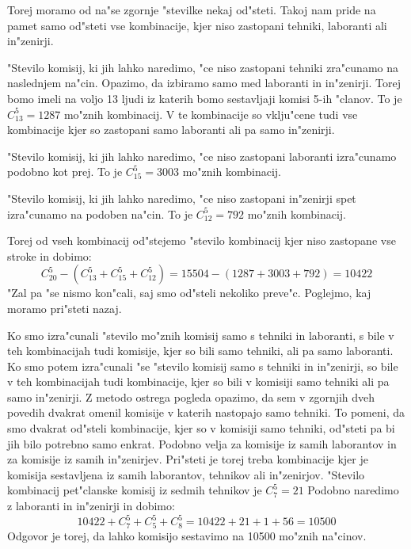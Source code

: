 \documentclass[a4paper, 12pt]{article}
\begin{document}
Torej moramo od na"se zgornje "stevilke nekaj od"steti. Takoj nam pride na pamet samo od"steti vse kombinacije, kjer niso zastopani tehniki, laboranti ali in"zenirji.

"Stevilo komisij, ki jih lahko naredimo, "ce niso zastopani tehniki zra"cunamo na naslednjem na"cin. Opazimo, da izbiramo samo med laboranti in in"zenirji. Torej bomo imeli na voljo 13 ljudi iz katerih bomo sestavljaji komisi 5-ih "clanov. To je $C_{13}^5 = 1287$ mo"znih kombinacij. V te kombinacije so vklju"cene tudi vse kombinacije kjer so zastopani samo laboranti ali pa samo in"zenirji.

"Stevilo komisij, ki jih lahko naredimo, "ce niso zastopani laboranti izra"cunamo podobno kot prej. To je $C_{15}^5 = 3003$ mo"znih kombinacij.

"Stevilo komisij, ki jih lahko naredimo, "ce niso zastopani in"zenirji spet izra"cunamo na podoben na"cin. To je $C_{12}^5 = 792$ mo"znih kombinacij.

Torej od vseh kombinacij od"stejemo "stevilo kombinacij kjer niso zastopane vse stroke in dobimo:
\begin{equation*}
C_{20}^5 - (C_{13}^5 + C_{15}^5 + C_{12}^5) = 15504 - (1287 + 3003 + 792) = 10 422
\end{equation*}
"Zal pa "se nismo kon"cali, saj smo od"steli nekoliko preve"c. Poglejmo, kaj moramo pri"steti nazaj.

Ko smo izra"cunali "stevilo mo"znih komisij samo s tehniki in laboranti, s bile v teh kombinacijah tudi komisije, kjer so bili samo tehniki, ali pa samo laboranti. Ko smo potem izra"cunali "se "stevilo komisij samo s tehniki in in"zenirji, so bile v teh kombinacijah tudi kombinacije, kjer so bili v komisiji samo tehniki ali pa samo in"zenirji. Z metodo ostrega pogleda opazimo, da sem v zgornjih dveh povedih dvakrat omenil komisije v katerih nastopajo samo tehniki. To pomeni, da smo dvakrat od"steli kombinacije, kjer so v komisiji samo tehniki, od"steti pa bi jih bilo potrebno samo enkrat. Podobno velja za komisije iz samih laborantov in za komisije iz samih in"zenirjev. Pri"steti je torej treba kombinacije kjer je komisija sestavljena iz samih laborantov, tehnikov ali in"zenirjov. "Stevilo kombinacij pet"clanske komisij iz sedmih tehnikov je $C_7^5 = 21$ Podobno naredimo z laboranti in in"zenirji in dobimo:
\begin{equation*}
10 422 + C_7^5 + C_5^5 + C_8^5 = 10422 + 21 + 1 + 56 = 10500
\end{equation*}
Odgovor je torej, da lahko komisijo sestavimo na 10500 mo"znih na"cinov.
\end{document}
